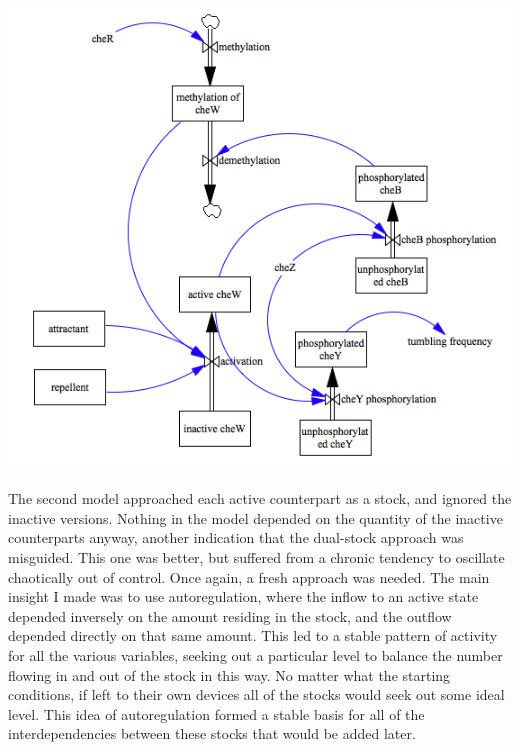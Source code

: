 \documentclass[12pt]{article}
\begin{document}
\includegraphics[scale=0.7]{dualstock.png}

The second model approached each active counterpart as a stock, and ignored the inactive versions.  Nothing in the model depended on the quantity of the inactive counterparts anyway, another indication that the dual-stock approach was misguided.  This one was better, but suffered from a chronic tendency to oscillate chaotically out of control.  Once again, a fresh approach was needed.  The main insight I made was to use autoregulation, where the inflow to an active state depended inversely on the amount residing in the stock, and the outflow depended directly on that same amount.  This led to a stable pattern of activity for all the various variables, seeking out a particular level to balance the number flowing in and out of the stock in this way.  No matter what the starting conditions, if left to their own devices all of the stocks would seek out some ideal level.  This idea of autoregulation formed a stable basis for all of the interdependencies between these stocks that would be added later.  
\end{document}
